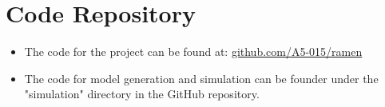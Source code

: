 \section{Code Repository}
\label{sec:appendix-for-code}

\begin{itemize}
    \item The code for the project can be found at: \href{https://github.com/A5-015/ramen}{github.com/A5-015/ramen} 
    \item The code for model generation and simulation can be founder under the "simulation" directory in the GitHub repository.
\end{itemize}

